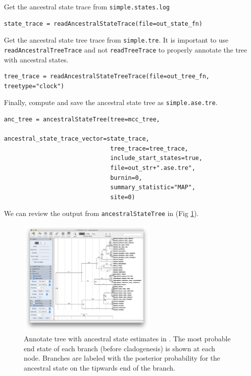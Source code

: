 Get the ancestral state trace from {\tt simple.states.log}

\begin{snugshade}
\begin{lstlisting}
state_trace = readAncestralStateTrace(file=out_state_fn)
\end{lstlisting}
\end{snugshade}


Get the ancestral state tree trace from {\tt simple.tre}.
It is important to use {\tt readAncestralTreeTrace} and not {\tt readTreeTrace} to properly annotate the tree with ancestral states.

\begin{snugshade}
\begin{lstlisting}
tree_trace = readAncestralStateTreeTrace(file=out_tree_fn, treetype="clock")
\end{lstlisting}
\end{snugshade}

Finally, compute and save the ancestral state tree as {\tt simple.ase.tre}.

\begin{snugshade}
\begin{lstlisting}
anc_tree = ancestralStateTree(tree=mcc_tree,
                              ancestral_state_trace_vector=state_trace,
                              tree_trace=tree_trace,
                              include_start_states=true,
                              file=out_str+".ase.tre",
                              burnin=0,
                              summary_statistic="MAP",
                              site=0)
\end{lstlisting}
\end{snugshade}

We can review the output from {\tt ancestralStateTree} in \FigTree (Fig \ref{fig:simple_FigTree_ase}).

\begin{figure}[!ht]
\centering
\includegraphics[width=0.6\textwidth]{figures/fig_simple_FigTree_ase.png}
\caption{Annotate tree with ancestral state estimates in \FigTree.
The most probable end state of each branch (before cladogenesis) is shown at each node.
Branches are labeled with the posterior probability for the ancestral state on the tipwards end of the branch.
}
\label{fig:simple_FigTree_ase}
\end{figure}

